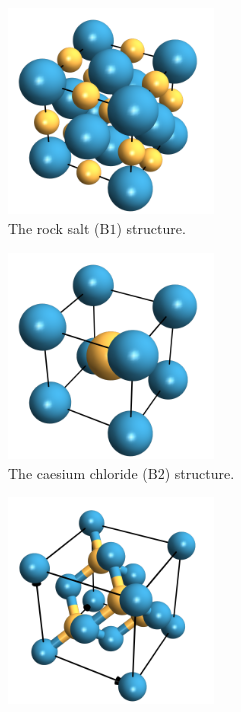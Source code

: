 \documentclass[fleqn]{NotesClass}
\begin{document}
    \begin{figure}
        \begin{subfigure}{0.6\textwidth}
            \centering
            \includegraphics[width=0.6\textwidth]{images/rocksalt.pdf}
            \caption[Rock salt structure.]{The rock salt (\(\mathrm{B1}\)) structure.}
        \end{subfigure}
        \begin{subfigure}{0.6\textwidth}
            \centering
            \includegraphics[width=0.6\textwidth]{images/CsCl.pdf}
            \caption[Caesium chloride structure.]{The caesium chloride (\(\mathrm{B2}\)) structure.}
        \end{subfigure}
        \begin{subfigure}{0.6\textwidth}
            \centering
            \includegraphics[width=0.6\textwidth]{images/ZnS1.pdf}

\end{subfigure}
\end{figure}
\end{document}
